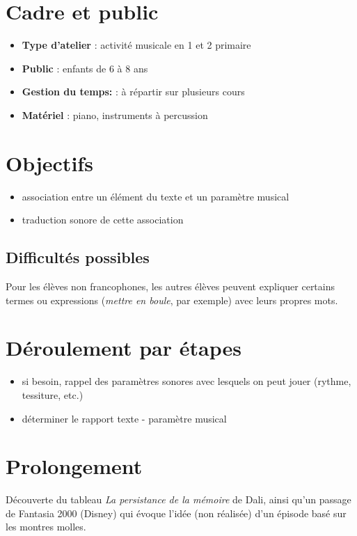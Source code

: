 \documentclass[a4paper,11pt,bibliography=totoc,numbers=noenddot,listof=flat,DIV=11,BCOR=0mm]{scrreprt}%
\begin{document}
\section*{Cadre et public}
\begin{itemize}
\item [\textbullet]\textbf{Type d'atelier} : activité musicale en 1\iere{} et 2\ieme{} primaire

\item [\textbullet]\textbf{Public} : enfants de 6 à 8 ans

\item [\textbullet]\textbf{Gestion du temps:} : à répartir sur plusieurs cours

\item [\textbullet]\textbf{Matériel} : piano, instruments à percussion
\end{itemize}

\section*{Objectifs}
\begin{itemize}
\item association entre un élément du texte et un paramètre musical
\item traduction sonore de cette association 
\end{itemize}

\subsection*{Difficultés possibles}
Pour les élèves non francophones, les autres élèves peuvent expliquer certains termes ou expressions (\emph{mettre en boule}, par exemple) avec leurs propres mots.

\section*{Déroulement par étapes}
\begin{itemize}
\item si besoin, rappel des paramètres sonores avec lesquels on peut jouer (rythme, tessiture, etc.)
\item déterminer le rapport texte - paramètre musical
\end{itemize}

\section*{Prolongement}
Découverte du tableau \emph{La persistance de la mémoire} de Dali, ainsi qu'un passage de Fantasia 2000 (Disney) qui évoque l'idée (non réalisée) d'un épisode basé sur les montres molles.
\end{document}
